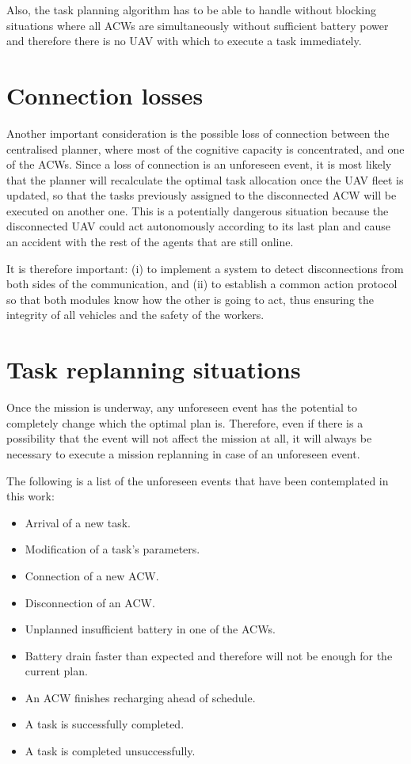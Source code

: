 Also, the task planning algorithm has to be able to handle without blocking situations where all \glspl{ACW} are simultaneously without sufficient battery power and therefore there is no \gls{UAV} with which to execute a task immediately.

\section{Connection losses}
\label{sec:ConnectionLosses}
Another important consideration is the possible loss of connection between the centralised planner, where most of the cognitive capacity is concentrated, and one of the \glspl{ACW}. Since a loss of connection is an unforeseen event, it is most likely that the planner will recalculate the optimal task allocation once the \gls{UAV} fleet is updated, so that the tasks previously assigned to the disconnected \gls{ACW} will be executed on another one. This is a potentially dangerous situation because the disconnected \gls{UAV} could act autonomously according to its last plan and cause an accident with the rest of the agents that are still online.

It is therefore important: (i) to implement a system to detect disconnections from both sides of the communication, and (ii) to establish a common action protocol so that both modules know how the other is going to act, thus ensuring the integrity of all vehicles and the safety of the workers.

\section{Task replanning situations} %
\label{sec:TaskReplanningSituations}
Once the mission is underway, any unforeseen event has the potential to completely change which the optimal plan is. Therefore, even if there is a possibility that the event will not affect the mission at all, it will always be necessary to execute a mission replanning in case of an unforeseen event.

The following is a list of the unforeseen events that have been contemplated in this work:

\begin{itemize}
    \item Arrival of a new task.
    \item Modification of a task's parameters.
    \item Connection of a new \gls{ACW}.
    \item Disconnection of an \gls{ACW}.
    \item Unplanned insufficient battery in one of the \glspl{ACW}.
    \item Battery drain faster than expected and therefore will not be enough for the current plan.
    \item An \gls{ACW} finishes recharging ahead of schedule.
    \item A task is successfully completed.
    \item A task is completed unsuccessfully.
\end{itemize}

